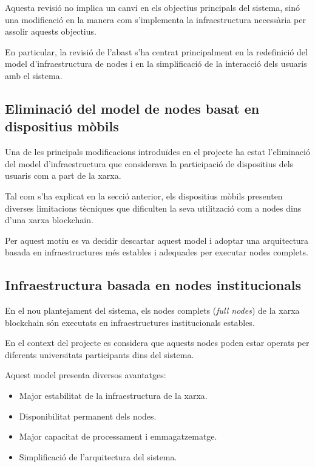 \documentclass[12pt,a4paper]{article}
\begin{document}
Aquesta revisió no implica un canvi en els objectius principals del sistema, sinó una modificació en la manera com s'implementa la infraestructura necessària per assolir aquests objectius.

En particular, la revisió de l'abast s'ha centrat principalment en la redefinició del model d'infraestructura de nodes i en la simplificació de la interacció dels usuaris amb el sistema.

\subsection{Eliminació del model de nodes basat en dispositius mòbils}

Una de les principals modificacions introduïdes en el projecte ha estat l'eliminació del model d'infraestructura que considerava la participació de dispositius dels usuaris com a part de la xarxa.

Tal com s'ha explicat en la secció anterior, els dispositius mòbils presenten diverses limitacions tècniques que dificulten la seva utilització com a nodes dins d'una xarxa blockchain.

Per aquest motiu es va decidir descartar aquest model i adoptar una arquitectura basada en infraestructures més estables i adequades per executar nodes complets.

\subsection{Infraestructura basada en nodes institucionals}

En el nou plantejament del sistema, els nodes complets (\textit{full nodes}) de la xarxa blockchain són executats en infraestructures institucionals estables.

En el context del projecte es considera que aquests nodes poden estar operats per diferents universitats participants dins del sistema.

Aquest model presenta diversos avantatges:

\begin{itemize}
\item Major estabilitat de la infraestructura de la xarxa.
\item Disponibilitat permanent dels nodes.
\item Major capacitat de processament i emmagatzematge.
\item Simplificació de l'arquitectura del sistema.
\end{itemize}
\end{document}
